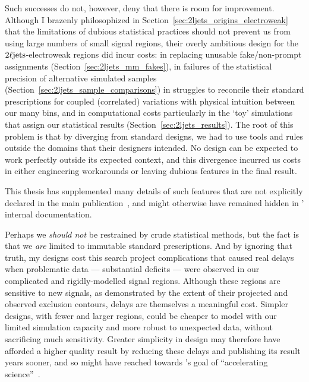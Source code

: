 Such successes do not, however, deny that there is room for improvement.
Although I brazenly philosophized in
Section~\ref{sec:2ljets_origins_electroweak} that the limitations of dubious
statistical practices should not prevent us from using large numbers of small
signal regions, their overly ambitious design for the $2\ell\mathrm{jets}$-electroweak
regions did incur costs:
in replacing unusable fake/non-prompt assignments
(Section~\ref{sec:2ljets_mm_fakes}),
in failures of the statistical precision of alternative simulated samples
(Section~\ref{sec:2ljets_sample_comparisons})
in struggles to reconcile their standard prescriptions for coupled
(correlated) variations with physical intuition between our many bins,
and in computational costs particularly in the `toy' simulations that assign
our statistical results (Section~\ref{sec:2ljets_results}).
The root of this problem is that by diverging from standard designs, we
had to use tools and rules outside the domains that their designers
intended.
No design can be expected to work perfectly outside its expected context,
and this divergence incurred us costs in either engineering workarounds or
leaving dubious features in the final result.

This thesis has supplemented many details of such features that are not
explicitly declared in the main publication~\cite{atlas2022searches},
and might otherwise have remained hidden in \atlas' internal documentation.

Perhaps we \emph{should not} be restrained by crude statistical
methods, but the fact is that we \emph{are} limited to immutable standard
prescriptions.
And by ignoring that truth, my designs cost this search project complications
that caused real delays when problematic data
--- substantial deficits ---
were observed in our complicated and rigidly-modelled signal regions.
Although these regions are sensitive to new signals, as demonstrated by the
extent of their projected and observed exclusion contours, delays are
themselves a meaningful cost.
Simpler designs, with fewer and larger regions, could be cheaper to model with
our limited simulation capacity and more robust to unexpected data, without
sacrificing much sensitivity.
Greater simplicity in design may therefore have afforded a higher quality
result by reducing these delays and publishing its result years sooner,
and so might have reached towards \cern's goal of
``accelerating science''~\cite{Radford:1551933}.

